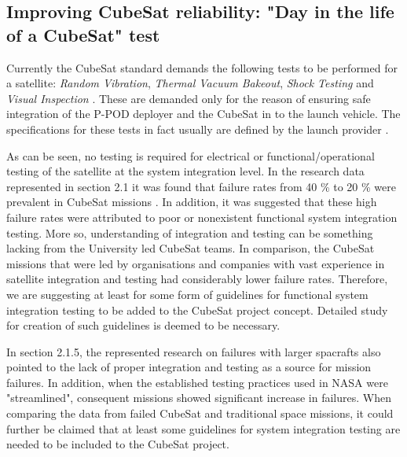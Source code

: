 \documentclass[english,12pt,a4paper,pdftex,elec,utf8]{aaltothesis}
\begin{document}
\subsection{Improving CubeSat reliability: "Day in the life of a CubeSat" test}
Currently the CubeSat standard demands the following tests to be performed for a satellite: \textit{Random Vibration}, \textit{Thermal Vacuum Bakeout}, \textit{Shock Testing} and \textit{Visual Inspection} \cite{cds}. These are demanded only for the reason of ensuring safe integration of the P-POD deployer and the CubeSat in to the launch vehicle. The specifications for these tests in fact usually are defined by the launch provider \cite{cds}.\par 
As can be seen, no testing is required for electrical or functional/operational testing of the satellite at the system integration level. In the research data represented in section 2.1 it was found that failure rates from 40 \% to 20 \% were prevalent in CubeSat missions \cite{Swart1, Swart2016, Swart2015}. In addition, it was suggested that these high failure rates were attributed to poor or nonexistent functional system integration testing. More so, understanding of integration and testing can be something lacking from the University led CubeSat teams. In comparison, the CubeSat missions that were led by organisations and companies with vast experience in satellite integration and testing had considerably lower failure rates.
Therefore, we are suggesting at least for some form of guidelines for functional system integration testing to be added to the CubeSat project concept. Detailed study for creation of such guidelines is deemed to be necessary. \par
In section 2.1.5, the represented research on failures with larger spacrafts also pointed to the lack of proper integration and testing as a source for mission failures. In addition, when the established testing practices used in NASA were "streamlined", consequent missions showed significant increase in failures. When comparing the data from failed CubeSat and traditional space missions, it could further be claimed that at least some guidelines for system integration testing are needed to be included to the CubeSat project. \par
\end{document}
